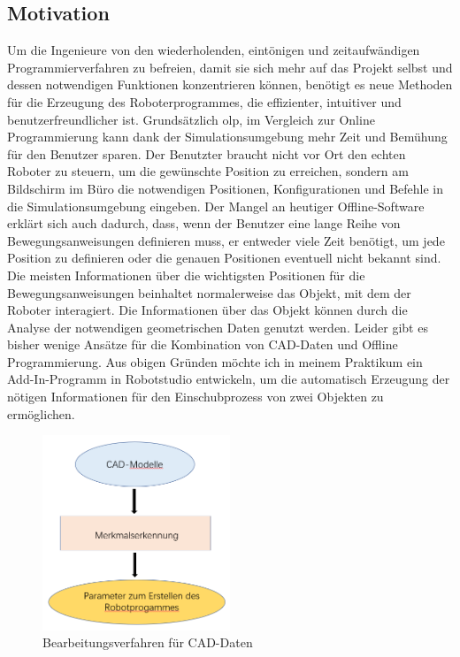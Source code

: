 \documentclass[14pt,a4paper,titlepage]{article}
\begin{document}
	\subsection{Motivation}
		Um die Ingenieure von den wiederholenden, eintönigen und zeitaufwändigen Programmierverfahren zu befreien, damit sie sich mehr auf das Projekt selbst und dessen notwendigen Funktionen konzentrieren können, benötigt es neue Methoden für die Erzeugung des Roboterprogrammes, die effizienter, intuitiver und benutzerfreundlicher ist. 
		\bigbreak
		Grundsätzlich \ac{olp}, im Vergleich zur Online Programmierung kann dank der Simulationsumgebung mehr Zeit und Bemühung für den Benutzer sparen. Der Benutzter braucht nicht vor Ort den echten Roboter zu steuern, um die gewünschte Position zu erreichen, sondern am Bildschirm im Büro die notwendigen Positionen, Konfigurationen und Befehle in die Simulationsumgebung eingeben. Der Mangel an heutiger Offline-Software erklärt sich auch dadurch, dass, wenn der Benutzer eine lange Reihe von Bewegungsanweisungen definieren muss, er entweder viele Zeit benötigt, um jede Position zu definieren oder die genauen Positionen eventuell nicht bekannt sind. 
		\bigbreak
		Die meisten Informationen über die wichtigsten Positionen für die Bewegungsanweisungen beinhaltet normalerweise das Objekt, mit dem der Roboter interagiert. Die Informationen über das Objekt können durch die Analyse der notwendigen geometrischen Daten genutzt werden. Leider gibt es bisher wenige Ansätze für die Kombination von CAD-Daten und Offline Programmierung.
		\bigbreak
		Aus obigen Gründen möchte ich in meinem Praktikum ein Add-In-Programm in Robotstudio entwickeln, um die automatisch Erzeugung der nötigen Informationen für den Einschubprozess von zwei Objekten zu ermöglichen. 
		\begin{figure}[h!]
			\centering
			\includegraphics[width=0.5\textwidth]{Bearbeitungsverfahren.png}
			\caption{Bearbeitungsverfahren für CAD-Daten}
			\label{fig1}
		\end{figure}
\end{document}
